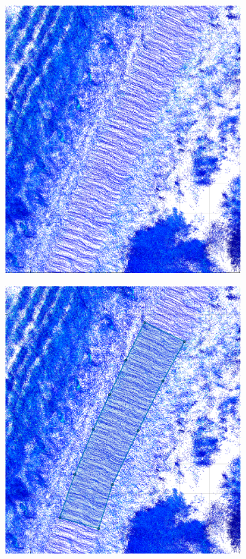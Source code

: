 \documentclass[numbered,pdftex]{ohio-etd}
\begin{document}
{{		\begin{figure}[H]
			\centering
			\begin{subfigure}{0.45\textwidth}
				\centering
				\includegraphics[width=1.0\linewidth]{Defense_Images/pre_select_area}
				\caption[Road area on Point Cloud]{}
				\label{fig:pre_select_area_in_results}
			\end{subfigure}
			\begin{subfigure}{0.45\textwidth}
				\centering
				\includegraphics[width=1.0\linewidth]{Defense_Images/area_selected}

\end{subfigure}
\end{figure}}}
\end{document}
